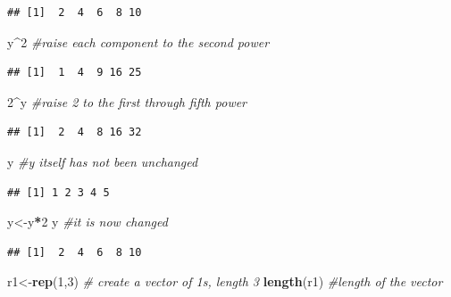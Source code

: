 \documentclass[12pt,]{krantz}
\newenvironment{Shaded}{\begin{snugshade}}{\end{snugshade}}
\newcommand{\CommentTok}[1]{\textcolor[rgb]{0.56,0.35,0.01}{\textit{#1}}}
\newcommand{\DecValTok}[1]{\textcolor[rgb]{0.00,0.00,0.81}{#1}}
\newcommand{\KeywordTok}[1]{\textcolor[rgb]{0.13,0.29,0.53}{\textbf{#1}}}
\newcommand{\NormalTok}[1]{#1}
\newcommand{\OperatorTok}[1]{\textcolor[rgb]{0.81,0.36,0.00}{\textbf{#1}}}
\theoremstyle{definition}
\theoremstyle{definition}
\theoremstyle{definition}
\theoremstyle{remark}
\begin{document}
\begin{verbatim}
## [1]  2  4  6  8 10
\end{verbatim}

\begin{Shaded}
\begin{Highlighting}[]
\NormalTok{y}\OperatorTok{^}\DecValTok{2}                 \CommentTok{#raise each component to the second power}
\end{Highlighting}
\end{Shaded}

\begin{verbatim}
## [1]  1  4  9 16 25
\end{verbatim}

\begin{Shaded}
\begin{Highlighting}[]
\DecValTok{2}\OperatorTok{^}\NormalTok{y                 }\CommentTok{#raise 2 to the first through fifth power}
\end{Highlighting}
\end{Shaded}

\begin{verbatim}
## [1]  2  4  8 16 32
\end{verbatim}

\begin{Shaded}
\begin{Highlighting}[]
\NormalTok{y                   }\CommentTok{#y itself has not been unchanged}
\end{Highlighting}
\end{Shaded}

\begin{verbatim}
## [1] 1 2 3 4 5
\end{verbatim}

\begin{Shaded}
\begin{Highlighting}[]
\NormalTok{y<-y}\OperatorTok{*}\DecValTok{2}
\NormalTok{y                   }\CommentTok{#it is now changed}
\end{Highlighting}
\end{Shaded}

\begin{verbatim}
## [1]  2  4  6  8 10
\end{verbatim}

\begin{Shaded}
\begin{Highlighting}[]
\NormalTok{r1<-}\KeywordTok{rep}\NormalTok{(}\DecValTok{1}\NormalTok{,}\DecValTok{3}\NormalTok{)        }\CommentTok{# create a vector of 1s, length 3}
\KeywordTok{length}\NormalTok{(r1)           }\CommentTok{#length of the vector}
\end{Highlighting}
\end{Shaded}
\end{document}
